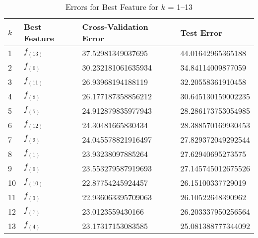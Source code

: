 \documentclass[12pt]{article}
\begin{document}
\begin{table}[htp]
\centering
\caption{Errors for Best Feature for $k$ = 1--13}\label{tab:no_basis}
\begin{tabular}{|l|l|l|l|}
	\hline
	$k$	& Best Feature	& Cross-Validation Error & Test Error         \\ \hline\hline
	1  	& $f_{(13)}$	& 37.52981349037695      & 44.01642965365188  \\ \hline
	2  	& $f_{(6)}$		& 30.232181061635934     & 34.84114009877059  \\ \hline
	3  	& $f_{(11)}$	& 26.93968194188119      & 32.20558361910458  \\ \hline
	4  	& $f_{(8)}$		& 26.177187358856212     & 30.645130159002235 \\ \hline
	5  	& $f_{(5)}$		& 24.912879835977943     & 28.286173753054985 \\ \hline
	6  	& $f_{(12)}$	& 24.30481665830434      & 28.388570169930453 \\ \hline
	7  	& $f_{(2)}$		& 24.045578821916497     & 27.829372049292544 \\ \hline
	8  	& $f_{(1)}$		& 23.93238097885264      & 27.62940695273575  \\ \hline
	9  	& $f_{(9)}$		& 23.553279587919693     & 27.145745012675526 \\ \hline
	10 	& $f_{(10)}$	& 22.87754245924457      & 26.15100337729019  \\ \hline
	11 	& $f_{(3)}$		& 22.936063395709063     & 26.10522648390962  \\ \hline
	12 	& $f_{(7)}$		& 23.0123559430166       & 26.203337950256564 \\ \hline
	13 	& $f_{(4)}$		& 23.17317153083585      & 25.081388777344092 \\ \hline
\end{tabular}
\end{table}
\end{document}
